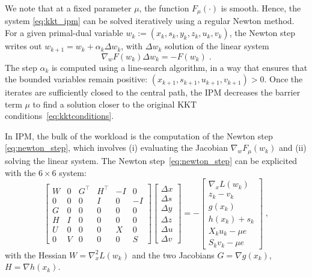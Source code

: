 We note that at a fixed parameter $\mu$, the function $F_\mu(\cdot)$
is smooth. Hence, the system \eqref{eq:kkt_ipm} can be solved iteratively
using a regular Newton method. For a given primal-dual variable
$w_k := (x_k, s_k, y_k, z_k, u_k, v_k)$, the Newton step writes out
$w_{k+1} = w_k + \alpha_k \Delta w_k$, with $\Delta w_k$ solution of the linear system
\begin{equation}
  \label{eq:newton_step}
  \nabla_w F(w_k) \Delta w_k = -F(w_k) \; .
\end{equation}
The step $\alpha_k$ is computed using a line-search algorithm, in a way
that ensures that the bounded variables remain positive: $(x_{k+1}, s_{k+1}, u_{k+1}, v_{k+1}) > 0$.
Once the iterates are sufficiently closed to the central path,
the IPM decreases the barrier term $\mu$ to find a solution closer to
the original KKT conditions~\eqref{eq:kktconditions}.

In IPM, the bulk of the workload is the computation of the Newton
step \eqref{eq:newton_step}, which involves (i) evaluating the Jacobian
$\nabla_w F_\mu(w_k)$ and (ii) solving the linear system.
The Newton step~\eqref{eq:newton_step} can be explicited with
the $6 \times 6$ system:
\begin{equation}
  \label{eq:kkt:unreduced}
  \tag{$K_3$}
  \begin{bmatrix}
    W & 0 & G^\top & H^\top & -I & 0 \\
    0 & 0 & 0 & I & 0 & -I \\
    G & 0 & 0 & 0 & 0 & 0 \\
    H & I & 0 & 0 & 0 & 0 \\
    U & 0 & 0 & 0 & X & 0 \\
    0 & V & 0 & 0 & 0 & S
  \end{bmatrix}
  \begin{bmatrix}
    \Delta x \\
    \Delta s \\
    \Delta y \\
    \Delta z \\
    \Delta u \\
    \Delta v
  \end{bmatrix}
  = - \begin{bmatrix}
    \nabla_x L(w_k) \\
       z_k - v_k  \\
       g(x_k)  \\
       h(x_k) + s_k  \\
       X_k u_k - \mu e  \\
       S_k v_k - \mu e
  \end{bmatrix} \; ,
\end{equation}
with the Hessian $W = \nabla^2_x L(w_k)$ and
the two Jacobians $G = \nabla g(x_k)$, $H = \nabla h(x_k)$.

